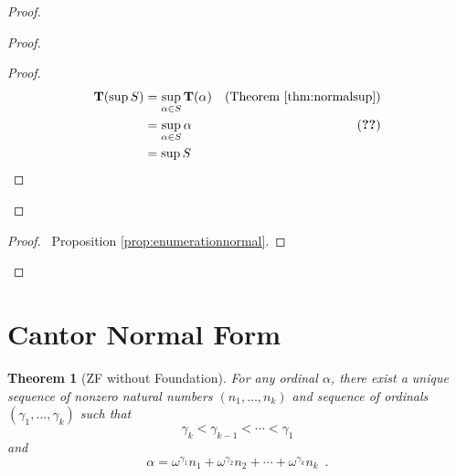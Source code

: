 \documentclass{book}
\let\qed\relax
\newtheorem{thm}[ax]{Theorem}
\theoremstyle{definition}
\begin{document}
\begin{proof}
\pf
{}
\begin{proof}
	\begin{proof}
		\pf
		\begin{align*}
			\mathbf{T}(\sup S) & = \sup_{\alpha \in S} \mathbf{T}(\alpha) & (\text{Theorem \ref{thm:normalsup}}) \\
			& = \sup_{\alpha \in S} \alpha & (\text{\stepref{a}}) \\
			& = \sup S
		\end{align*}
	\end{proof}
\end{proof}
\qedstep
\begin{proof}
	\pf\ Proposition \ref{prop:enumerationnormal}.
\end{proof}
\qed
\end{proof}

\section{Cantor Normal Form}

\begin{thm}[ZF without Foundation]
For any ordinal $\alpha$, there exist a unique sequence of nonzero natural numbers $(n_1, \ldots, n_k)$ and sequence of ordinals $(\gamma_1, \ldots, \gamma_k)$ such that
\[ \gamma_k < \gamma_{k-1} < \cdots < \gamma_1 \]
and
\[ \alpha = \omega^{\gamma_1} n_1 + \omega^{\gamma_2} n_2 + \cdots + \omega^{\gamma_k} n_k \enspace . \]
\end{thm}
\end{document}
